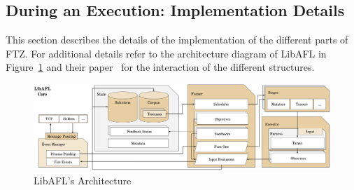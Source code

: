\documentclass{article}
\newcommand{\proj}{FTZ\xspace}
\let\savedCite=\cite
\renewcommand{\cite}{\unskip~\savedCite}
\begin{document}
\begin{multicols}{2}
  \subsection{During an Execution: Implementation Details}

  This section describes the details of the implementation of the different parts of \proj. For additional details refer to the architecture diagram of LibAFL in Figure~\ref{fig:LibAFLArchitecture} and their paper\cite{LibAFL} for the interaction of the different structures.

\end{multicols}
\vspace{1em}
\begin{figure}[h]
  \centering
  \includegraphics[width=\textwidth]{assets/LibAFLArchitecture.png}
  \caption{LibAFL's Architecture\cite{LibAFL}}
  \label{fig:LibAFLArchitecture}
\end{figure}
\end{document}

